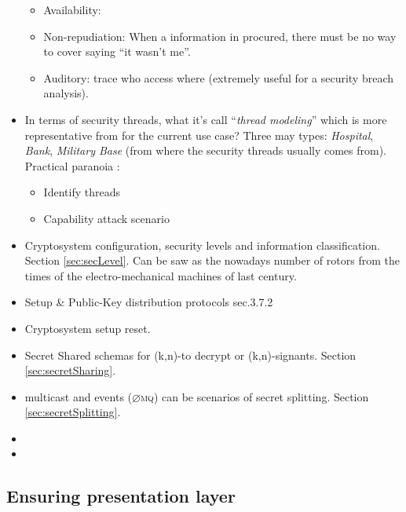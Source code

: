 \documentclass[10pt,a4paper,twoside]{llncs}
\newcommand{\zmq}{\textsc{$\varnothing$mq}}
\begin{document}
\begin{itemize}
\begin{itemize}
  \item Availability:
  \item Non-repudiation: When a information in procured, there must be no way to cover saying ``it wasn't me''.
  \item Auditory: trace who access where (extremely useful for a security breach analysis).
 \end{itemize}
 \item In terms of security threads, what it's call ``\emph{thread modeling}'' which is more representative from \cite{SecEngRossAnderson} for the current use case? Three may types: \emph{Hospital}, \emph{Bank}, \emph{Military Base} (from where the security threads usually comes from). Practical paranoia \cite{PractCryptoSchneier}:
 \begin{itemize}
  \item Identify threads
  \item Capability attack scenario
 \end{itemize}
 \item Cryptosystem configuration, security levels and information classification. Section \ref{sec:secLevel}. Can be saw as the nowadays number of rotors from the times of the electro-mechanical machines of last century.
 \item Setup \& Public-Key distribution protocols \cite{SecEngRossAnderson} sec.3.7.2
 \item Cryptosystem setup reset.
 \item Secret Shared schemas for (k,n)-to decrypt or (k,n)-signants. Section \ref{sec:secretSharing}.
 \item multicast and events (\zmq) can be scenarios of secret splitting. Section \ref{sec:secretSplitting}.
 \item 
 \item 
\end{itemize}

%
\subsection{Ensuring presentation layer \label{sec:presentationLayer}}
\end{document}
